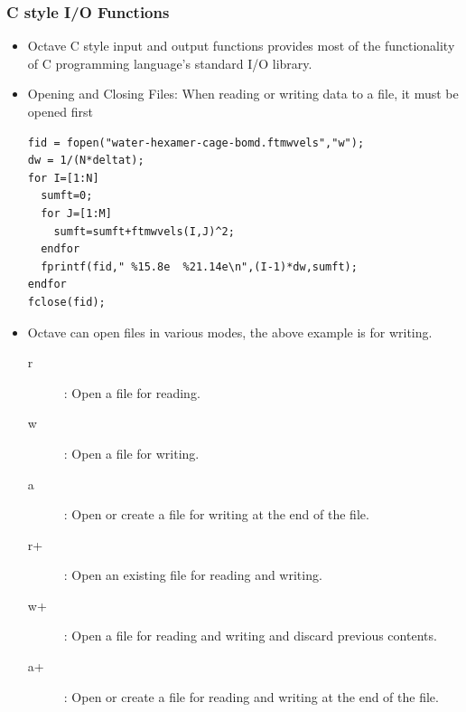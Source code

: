 \documentclass[t,compress,xcolor=svgnames]{beamer}
\begin{document}
\begin{frame}[fragile]
  \frametitle{\small C style I/O Functions}
  \begin{itemize}
    \item Octave C style input and output functions provides most of the functionality of C programming language's standard I/O library.
    \item Opening and Closing Files: When reading or writing data to a file, it must be opened first
    {\tiny
      \begin{verbatim}
fid = fopen("water-hexamer-cage-bomd.ftmwvels","w");
dw = 1/(N*deltat);
for I=[1:N]
  sumft=0;
  for J=[1:M]
    sumft=sumft+ftmwvels(I,J)^2;
  endfor
  fprintf(fid," %15.8e  %21.14e\n",(I-1)*dw,sumft);
endfor
fclose(fid);
      \end{verbatim}
    }
    \item Octave can open files in various modes, the above example is for writing.
    \begin{description}
      \item[r]: Open a file for reading.
      \item[w]: Open a file for writing.
      \item[a]: Open or create a file for writing at the end of the file.
      \item[r+]: Open an existing file for reading and writing.
      \item[w+]: Open a file for reading and writing and discard previous contents.
      \item[a+]: Open or create a file for reading and writing at the end of the file.
    \end{description}
  \end{itemize}
\end{frame}
\end{document}
